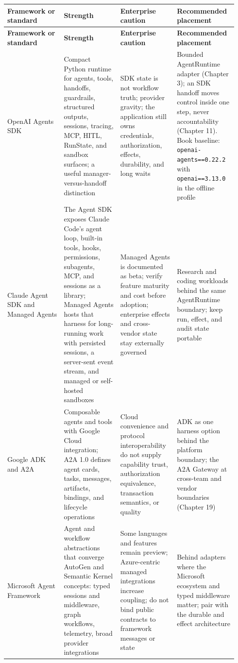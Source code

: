 \BookTableStart
\fontsize{7.2}{9}\selectfont
\begin{longtable}{@{}Y{0.2350\linewidth}Y{0.2350\linewidth}Y{0.2350\linewidth}Y{0.2350\linewidth}@{}}
\color{white}\bfseries \textbf{Framework or standard} & \color{white}\bfseries \textbf{Strength} & \color{white}\bfseries \textbf{Enterprise caution} & \color{white}\bfseries \textbf{Recommended placement} \\
\endfirsthead
{}
\color{white}\bfseries \textbf{Framework or standard} & \color{white}\bfseries \textbf{Strength} & \color{white}\bfseries \textbf{Enterprise caution} & \color{white}\bfseries \textbf{Recommended placement} \\
\endhead
OpenAI Agents SDK & Compact Python runtime for agents, tools, handoffs, guardrails, structured outputs, sessions, tracing, MCP, HITL, RunState, and sandbox surfaces; a useful manager-versus-handoff distinction & SDK state is not workflow truth; provider gravity; the application still owns credentials, authorization, effects, durability, and long waits & Bounded AgentRuntime adapter (Chapter 3); an SDK handoff moves control inside one step, never accountability (Chapter 11). Book baseline: \lstinline[style=bookinline]!openai-agents==0.22.2! with \lstinline[style=bookinline]!openai==3.13.0! in the offline profile \\
Claude Agent SDK and Managed Agents & The Agent SDK exposes Claude Code's agent loop, built-in tools, hooks, permissions, subagents, MCP, and sessions as a library; Managed Agents hosts that harness for long-running work with persisted sessions, a server-sent event stream, and managed or self-hosted sandboxes & Managed Agents is documented as beta; verify feature maturity and cost before adoption; enterprise effects and cross-vendor state stay externally governed & Research and coding workloads behind the same AgentRuntime boundary; keep run, effect, and audit state portable \\
Google ADK and A2A & Composable agents and tools with Google Cloud integration; A2A 1.0 defines agent cards, tasks, messages, artifacts, bindings, and lifecycle operations & Cloud convenience and protocol interoperability do not supply capability trust, authorization equivalence, transaction semantics, or quality & ADK as one harness option behind the platform boundary; the A2A Gateway at cross-team and vendor boundaries (Chapter 19) \\
Microsoft Agent Framework & Agent and workflow abstractions that converge AutoGen and Semantic Kernel concepts: typed sessions and middleware, graph workflows, telemetry, broad provider integrations & Some languages and features remain preview; Azure-centric managed integrations increase coupling; do not bind public contracts to framework messages or state & Behind adapters where the Microsoft ecosystem and typed middleware matter; pair with the durable and effect architecture \\

\end{longtable}
